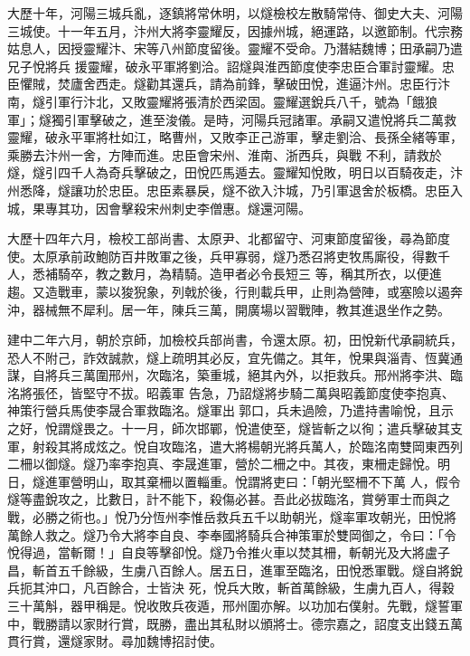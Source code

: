 \begin{pinyinscope}
 大歷十年，河陽三城兵亂，逐鎮將常休明，以燧檢校左散騎常侍、御史大夫、河陽三城使。十一年五月，汴州大將李靈耀反，因據州城，絕運路，以邀節制。代宗務姑息人，因授靈耀汴、宋等八州節度留後。靈耀不受命。乃潛結魏博；田承嗣乃遣兄子悅將兵
 援靈耀，破永平軍將劉洽。詔燧與淮西節度使李忠臣合軍討靈耀。忠臣懼賊，焚廬舍西走。燧勸其還兵，請為前鋒，擊破田悅，進逼汴州。忠臣行汴南，燧引軍行汴北，又敗靈耀將張清於西梁固。靈耀選銳兵八千，號為「餓狼軍」；燧獨引軍擊破之，進至浚儀。是時，河陽兵冠諸軍。承嗣又遣悅將兵二萬救靈耀，破永平軍將杜如江，略曹州，又敗李正己游軍，擊走劉洽、長孫全緒等軍，乘勝去汴州一舍，方陣而進。忠臣會宋州、淮南、浙西兵，與戰
 不利，請救於燧，燧引四千人為奇兵擊破之，田悅匹馬遁去。靈耀知悅敗，明日以百騎夜走，汴州悉降，燧讓功於忠臣。忠臣素暴戾，燧不欲入汴城，乃引軍退舍於板橋。忠臣入城，果專其功，因會擊殺宋州刺史李僧惠。燧還河陽。



 大歷十四年六月，檢校工部尚書、太原尹、北都留守、河東節度留後，尋為節度使。太原承前政鮑防百井敗軍之後，兵甲寡弱，燧乃悉召將吏牧馬廝役，得數千人，悉補騎卒，教之數月，為精騎。造甲者必令長短三
 等，稱其所衣，以便進趨。又造戰車，蒙以狻猊象，列戟於後，行則載兵甲，止則為營陣，或塞險以遏奔沖，器械無不犀利。居一年，陳兵三萬，開廣場以習戰陣，教其進退坐作之勢。



 建中二年六月，朝於京師，加檢校兵部尚書，令還太原。初，田悅新代承嗣統兵，恐人不附己，詐效誠款，燧上疏明其必反，宜先備之。其年，悅果與淄青、恆冀通謀，自將兵三萬圍邢州，次臨洺，築重城，絕其內外，以拒救兵。邢州將李洪、臨洺將張伾，皆堅守不拔。昭義軍
 告急，乃詔燧將步騎二萬與昭義節度使李抱真、神策行營兵馬使李晟合軍救臨洺。燧軍出郭口，兵未過險，乃遣持書喻悅，且示之好，悅謂燧畏之。十一月，師次邯鄲，悅遣使至，燧皆斬之以徇；遣兵擊破其支軍，射殺其將成炫之。悅自攻臨洺，遣大將楊朝光將兵萬人，於臨洺南雙岡東西列二柵以御燧。燧乃率李抱真、李晟進軍，營於二柵之中。其夜，東柵走歸悅。明日，燧進軍營明山，取其棄柵以置輜重。悅謂將吏曰：「朝光堅柵不下萬
 人，假令燧等盡銳攻之，比數日，計不能下，殺傷必甚。吾此必拔臨洺，賞勞軍士而與之戰，必勝之術也。」悅乃分恆州李惟岳救兵五千以助朝光，燧率軍攻朝光，田悅將萬餘人救之。燧乃令大將李自良、李奉國將騎兵合神策軍於雙岡御之，令曰：「令悅得過，當斬爾！」自良等擊卻悅。燧乃令推火車以焚其柵，斬朝光及大將盧子昌，斬首五千餘級，生虜八百餘人。居五日，進軍至臨洺，田悅悉軍戰。燧自將銳兵扼其沖口，凡百餘合，士皆決
 死，悅兵大敗，斬首萬餘級，生虜九百人，得穀三十萬斛，器甲稱是。悅收敗兵夜遁，邢州圍亦解。以功加右僕射。先戰，燧誓軍中，戰勝請以家財行賞，既勝，盡出其私財以頒將士。德宗嘉之，詔度支出錢五萬貫行賞，還燧家財。尋加魏博招討使。




\end{pinyinscope}
